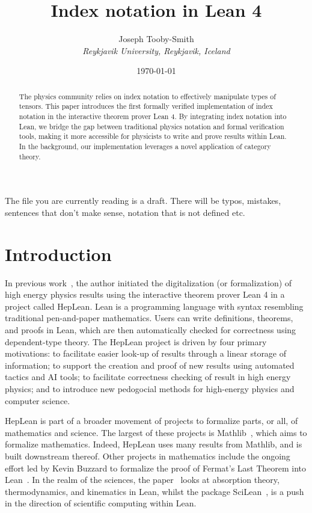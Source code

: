 \documentclass[a4paper, 11pt]{article}
\title{Index notation in Lean 4}
\author{Joseph Tooby-Smith \\ \textit{Reykjavik University, Reykjavik, Iceland}}
\date{\today}
\begin{document}
\maketitle
\vspace{-1cm}
\begin{abstract}
The physics community relies on index notation to effectively manipulate types of tensors.
This paper introduces the first formally verified implementation of index notation in the
interactive theorem prover Lean 4. By integrating index notation into Lean, we bridge the gap between 
traditional physics notation and formal verification tools, 
making it more accessible for physicists to write and prove results within Lean.
In the background, our implementation leverages a novel application of category theory.
\end{abstract}

{\color{mycolor} The file you are currently reading is a draft. There will 
be typos, mistakes, sentences that don't make sense, notation that is not defined etc.}
\section{Introduction}

In previous work~\cite{HepLean}, the author initiated the digitalization (or formalization) 
of high energy physics 
results using the interactive theorem prover Lean 4 in a project called HepLean. 
Lean is a
programming language with syntax resembling traditional pen-and-paper mathematics. 
Users can write definitions, theorems, and proofs in Lean,
which are then automatically checked for correctness using dependent-type theory.
The HepLean project is driven by four primary motivations: to facilitate easier look-up of results
 through a linear storage of information; to support the creation and proof of new results using 
 automated tactics and AI tools; to facilitate correctness checking of result in high energy physics; 
 and to introduce new pedogocial methods for high-energy physics and computer science.

HepLean is part of a broader movement of projects
to formalize parts, or all, of 
mathematics and science. The largest of these projects is Mathlib~\cite{mathlib}, which aims to formalize
mathematics. Indeed, HepLean uses many results from Mathlib, and is built downstream thereof.
Other projects in mathematics include the ongoing effort led by Kevin Buzzard to formalize the proof of Fermat's
Last Theorem into Lean~\cite{FLT}. 
In the realm of the sciences, the paper~\cite{josephson} looks at absorption theory, thermodynamics, and kinematics in Lean, 
whilst the package SciLean~\cite{SciLean}, is a push in the direction of scientific computing within Lean. 
\end{document}
